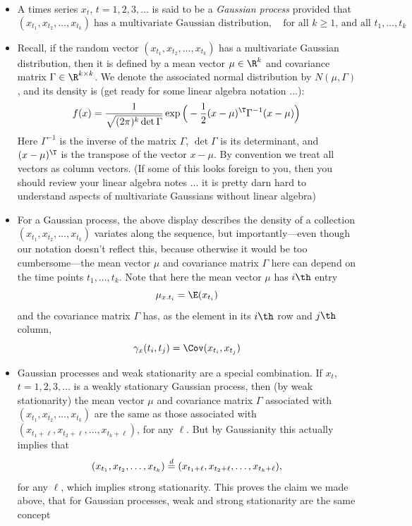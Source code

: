 \documentclass{article}
\begin{document}
\begin{itemize}
\item A times series $x_t$, $t = 1,2,3,\dots$ is said to be a \emph{Gaussian
    process} provided that  
  \[
  (x_{t_1}, x_{t_2}, \dots, x_{t_k}) \; \text{has a multivariate Gaussian
    distribution}, \quad \text{for all $k \geq 1$, and all $t_1,\dots,t_k$} 
  \]

\item Recall, if the random vector $(x_{t_1}, x_{t_2}, \dots, x_{t_k})$ has a 
  multivariate Gaussian distribution, then it is defined by a mean vector $\mu
  \in \R^k$ and covariance matrix $\Gamma \in \R^{k \times k}$. We denote the 
  associated normal distribution by $N(\mu, \Gamma)$, and its density is (get
  ready for some linear algebra notation ...):
  \[
  f(x) = \frac{1}{\sqrt{(2\pi)^k \det \Gamma}} \exp \Big( -
  \frac{1}{2} (x - \mu)^\T \Gamma^{-1} ( x - \mu ) \Big) 
  \]
  Here $\Gamma^{-1}$ is the inverse of the matrix $\Gamma$, $\det \Gamma$ is its
  determinant, and $(x-\mu)^\T$ is the transpose of the vector $x-\mu$.
  By convention we treat all vectors as column vectors. (If some of this looks
  foreign to you, then you should review your linear algebra notes ... it is
  pretty darn hard to understand aspects of multivariate Gaussians without 
  linear algebra) 

\item For a Gaussian process, the above display describes the density of a
  collection $(x_{t_1}, x_{t_2}, \dots, x_{t_k})$ variates along the sequence,
  but importantly---even though our notation doesn't reflect this, because
  otherwise it would be too cumbersome---the mean vector $\mu$ and covariance
  matrix $\Gamma$ here can depend on the time points $t_1,\dots,t_k$. Note that
  here the mean vector $\mu$ has $i\th$ entry
  \[
  \mu_{x.t_i} = \E(x_{t_i})
  \]
  and the covariance matrix $\Gamma$ has, as the element in its $i\th$ row and
  $j\th$ column, 
  \[
  \gamma_x(t_i, t_j) = \Cov(x_{t_i}, x_{t_j})
  \]

\item Gaussian processes and weak stationarity are a special combination. If
  $x_t$, $t = 1,2,3,\dots$ is a weakly stationary Gaussian process, then (by
  weak stationarity) the mean vector $\mu$ and covariance matrix $\Gamma$
  associated with $(x_{t_1}, x_{t_2}, \dots, x_{t_k})$ are the same as those
  associated with $(x_{t_1+\ell}, x_{t_2+\ell}, \dots, x_{t_k+\ell})$, for any
  $\ell$. But by Gaussianity this actually implies that 
  \[
  (x_{t_1}, x_{t_2}, \dots, x_{t_k}) \overset{d}{=} (x_{t_1+\ell}, x_{t_2+\ell}, \dots,
  x_{t_k+\ell}),
  \]
  for any $\ell$, which implies strong stationarity. This proves the claim we
  made above, that for Gaussian processes, weak and strong stationarity are the
  same concept 
\end{itemize}
\end{document}
